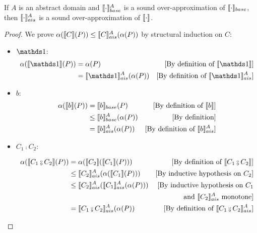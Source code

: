 \documentclass[
  10pt,       %
  twoside,    %
  a4paper,    %
  english,    %
  tikz,       %
  openright,  %
]{book}
\begin{document}
\begin{theorem}
  \label{thm:sound-ai}
  If $A$ is an abstract domain and $\llbracket \cdot \rrbracket_{base}^A$ is a sound 
  over-approximation of $\llbracket \cdot \rrbracket_{base}$, then $\llbracket \cdot \rrbracket_{ais}^{A}$ is a sound 
  over-approximation of $\llbracket \cdot \rrbracket$.
\end{theorem}
\begin{proof}
  We prove $\alpha(\llbracket C \rrbracket(P)) \leq \llbracket C \rrbracket_{ais}^{A}(\alpha(P))$ by structural
  induction on $C$:

  \begin{itemize}
    \item $\sskip$:
      \begin{align*}
        \alpha(\sem{\sskip}(P))
          &= \alpha(P)
          & \text{[By definition of $\sem{\sskip}$]}\\
          &= \asem{\sskip}(\alpha(P)) 
          & \text{[By definition of $\asem{\sskip}$]}\\
      \end{align*}

    \item $b$:
      \begin{align*}
        \alpha(\llbracket b \rrbracket(P))
          &= \llbracket b \rrbracket_{base}(P)
          & \text{[By definition of $\llbracket b \rrbracket$]}\\
          &\leq \llbracket b \rrbracket_{base}^A(\alpha(P))
          & \text{[By definition]}\\
          &= \llbracket b \rrbracket_{ais}^{A}(\alpha(P)) 
          & \text{[By definition of $\llbracket b \rrbracket_{ais}^{A}$]}\\
      \end{align*}

    \item $C_1 \fcmp C_2$:

      \begin{align*}
        \alpha(\sem{C_1 \fcmp C_2}(P))
          &= \alpha(\sem{C_2}(\sem{C_1}(P)))
          &\text{[By definition of $\sem{C_1 \fcmp C_2}$]}\\
          &\leq \asem{C_2}(\alpha(\sem{C_1}(P)))
          &\text{[By inductive hypothesis on $C_2$]}\\
          &\leq \asem{C_2}(\asem{C_1}(\alpha(P)))
          &\text{[By inductive hypothesis on $C_1$} \\
          && \text{and $\asem{C_2}$ monotone]}\\
          &= \asem{C_1 \fcmp C_2}(\alpha(P))
          &\text{[By definition of $\asem{C_1 \fcmp C_2}$]}\\
      \end{align*}
  

\end{itemize}
\end{proof}
\end{document}
